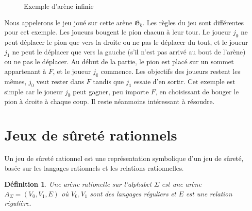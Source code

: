 \documentclass[12pt,a4paper,oneside,titlepage]{report}
\newtheorem{defi}{D\'efinition}[section]
\begin{document}
\begin{figure}[H]
\centering
{}
\caption{Exemple d'arène infinie}
\label{fig:infinite-arena}
\end{figure}
\noindent Nous appelerons le jeu joué sur cette arène $\mathfrak{G}_k$. Les règles du jeu sont différentes pour cet exemple. Les joueurs bougent le pion chacun à leur tour. Le joueur $j_0$ ne peut déplacer le pion que vers la droite ou ne pas le déplacer du tout, et le joueur $j_1$ ne peut le déplacer que vers la gauche (s'il n'est pas arrivé au bout de l'arène) ou ne pas le déplacer. Au début de la partie, le pion est placé sur un sommet appartenant à $F$, et le joueur $j_0$ commence. Les objectifs des joueurs restent les mêmes, $j_0$ veut rester dans $F$ tandis que $j_1$ essaie d'en sortir. Cet exemple est simple car le joueur $j_0$ peut gagner, peu importe $F$, en choisissant de bouger le pion à droite à chaque coup. Il reste néanmoins intéressant à résoudre.

\section{Jeux de sûreté rationnels}
Un jeu de sûreté rationnel est une représentation symbolique d'un jeu de sûreté, basée sur les langages rationnels et les relations rationnelles.
\begin{defi}
Une \emph{arène rationelle} sur l'alphabet $\Sigma$ est une arène $A_\Sigma=(V_0,V_1,E)$ où $V_0,V_1$ sont des langages réguliers et $E$ est une relation régulière.
\end{defi}
\end{document}
